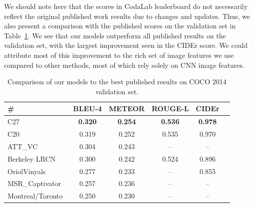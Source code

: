 We should note here that the scores in CodaLab leaderboard do not necessarily
reflect the original published work results due to changes and updates.
Thus, we also present a comparison with the published scores on the validation
set in Table~\ref{tab:resCocPubVal}.
We see that our models outperform all published results on the validation set,
with the largest improvement seen in the CIDEr score.
We could attribute most of this improvement to the rich set of image features we
use compared to other methods, most of which rely solely on CNN image features.
\begin{table}[tbh]
  \centering
  \begin{adjustbox}{center}
  \begin{tabular}{|l|c|c|c|c|c|}
    \hline\hline
    \bf \# &BLEU-4 &METEOR &ROUGE-L&CIDEr\\\hline
    C27 & \bf0.320&\bf0.254 &\bf0.536 &\bf0.978 \\
    C20 & 0.319 & 0.252 & 0.535 & 0.970 \\\hline
    ATT\_VC~\cite{you2016image} & 0.304& 0.243& -- & -- \\
    Berkeley LRCN~\cite{donahue2015long} & 0.300& 0.242& 0.524 & 0.896 \\
    OriolVinyals~\cite{Vinyals_2015_CVPR} & 0.277& 0.233& -- & 0.855 \\
    MSR\_Captivator~\cite{Fang2015} & 0.257& 0.236& -- & -- \\
    Montreal/Toronto~\cite{Xu2015show} & 0.250& 0.230& -- & -- \\
    \hline \hline
  \end{tabular}
  \end{adjustbox}
  \caption{Comparison of our models to the best published results on COCO 2014 validation set.}
  \label{tab:resCocPubVal}
\end{table}


